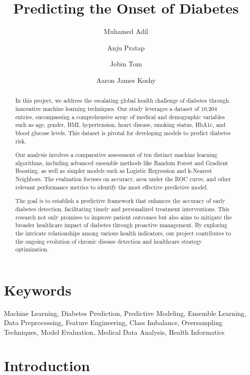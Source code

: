 \documentclass[a4paper,num-refs,gigabyte]{oup-contemporary}
\title{Predicting the Onset of Diabetes }
\author[1,\authfn{1},\authfn{2}]{Muhamed Adil}
\author[2,\authfn{1},\authfn{2}]{Anju Pratap}
\author[3,\authfn{1},\authfn{2}]{Jobin Tom}
\author[4,\authfn{1},\authfn{2}]{Aaron James Koshy}
\affil[1]{Department of Computer Science and Engineering, Saintgits College of Engineering (Autonomous)}
\begin{document}
\begin{frontmatter}
\maketitle
\begin{abstract}
In this project, we address the escalating global health challenge of diabetes through innovative machine learning techniques. Our study leverages a dataset of 10,204 entries, encompassing a comprehensive array of medical and demographic variables such as age, gender, BMI, hypertension, heart disease, smoking status, HbA1c, and blood glucose levels. This dataset is pivotal for developing models to predict diabetes risk.

Our analysis involves a comparative assessment of ten distinct machine learning algorithms, including advanced ensemble methods like Random Forest and Gradient Boosting, as well as simpler models such as Logistic Regression and k-Nearest Neighbors. The evaluation focuses on accuracy, area under the ROC curve, and other relevant performance metrics to identify the most effective predictive model.

The goal is to establish a predictive framework that enhances the accuracy of early diabetes detection, facilitating timely and personalized treatment interventions. This research not only promises to improve patient outcomes but also aims to mitigate the broader healthcare impact of diabetes through proactive management. By exploring the intricate relationships among various health indicators, our project contributes to the ongoing evolution of chronic disease detection and healthcare strategy optimization.
\end{abstract}
\end{frontmatter}

\section{Keywords}

Machine Learning, Diabetes Prediction, Predictive Modeling, Ensemble Learning, Data Preprocessing, Feature Engineering, Class Imbalance, Oversampling Techniques, Model Evaluation, Medical Data Analysis, Health Informatics





\section{Introduction}
\end{document}

